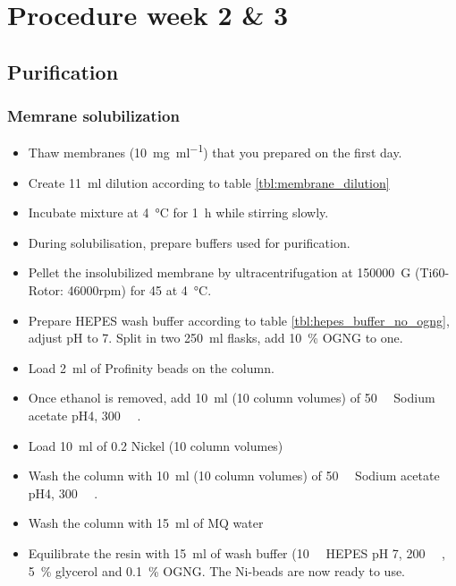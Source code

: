 \chapter{Procedure week 2 \& 3}

\section{Purification}

\subsection{Memrane solubilization}

\begin{itemize}
	\item Thaw membranes (\SI{10}{\mg\per\ml}) that you prepared on the
		first day.
	\item Create \SI{11}{\ml} dilution according to table
		\ref{tbl:membrane_dilution}
	\item Incubate mixture at \SI{4}{\celsius} for \SI{1}{\hour} while
		stirring slowly.
	\item During solubilisation, prepare buffers used for purification.
	\item Pellet the insolubilized membrane by ultracentrifugation at
		\SI{150000}{G} (Ti60-Rotor: 46000rpm) for \SI{45}{\min} at
		\SI{4}{\celsius}.
	\item Prepare HEPES wash buffer according to table
		\ref{tbl:hepes_buffer_no_ogng}, adjust pH to 7. Split in two
		\SI{250}{\ml} flasks, add \SI{10}{\percent} OGNG to one.
	\item Load \SI{2}{\ml} of Profinity beads on the column.
	\item Once ethanol is removed, add \SI{10}{\ml} (10 column volumes) of
		\SI{50}{\milli\Molar} Sodium acetate pH4,
		\SI{300}{\milli\Molar} .
	\item Load \SI{10}{\ml} of \SI{0.2}{\Molar} Nickel (10 column volumes) 
	\item Wash the column with \SI{10}{\ml} (10 column volumes) of
		\SI{50}{\milli\Molar} Sodium acetate pH4,
		\SI{300}{\milli\Molar} .
	\item Wash the column with \SI{15}{\ml} of MQ water
	\item Equilibrate the resin with \SI{15}{\ml} of wash buffer
		(\SI{10}{\milli\Molar} HEPES pH 7, \SI{200}{\milli\Molar}
		, \SI{5}{\percent} glycerol and \SI{0.1}{\percent}
		OGNG. The Ni-beads are now ready to use.
\end{itemize}

